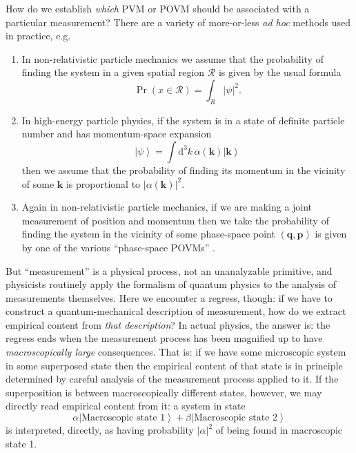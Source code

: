 \documentclass[12pt]{article}
\newcommand{\be}{\begin{equation}}
\newcommand{\ee}{\end{equation}}
\newcommand{\vctr}[1]{\ensuremath{\mathbf{ #1 }}}
\newcommand{\dr}[1]{\ensuremath{\mathrm{d} #1\,}}
\newcommand{\mc}[1]{\ensuremath{\mathcal{#1}}}
\newcommand{\ket}[1]{\ensuremath{\left|  #1 \right\rangle}}
\begin{document}
How do we establish \emph{which} PVM or POVM should be associated with a particular measurement? There are a variety of more-or-less \emph{ad hoc} methods used in practice, e.g.
\begin{enumerate}
\item In non-relativistic particle mechanics we assume that the probability of finding the system in a given spatial region \mc{R} is given by the usual formula 
\be
\Pr(x \in \mc{R})=\int_R |\psi|^2.
\ee
\item In high-energy particle physics,  if the system is in a state of definite particle number and has momentum-space expansion
\be
\ket{\psi}=\int \dr{^3 k} \alpha(\vctr{k}) \ket{\vctr{k}}
\ee
then we assume that the probability of finding its momentum in the vicinity of some $\vctr{k}$ is proportional to $|\alpha(\vctr{k})|^2$.
\item Again in non-relativistic particle mechanics, if we are making a joint measurement of position and momentum then we take the probability of finding the system in the vicinity of some phase-space point $(\vctr{q},\vctr{p})$ is given by one of the various ``phase-space POVMs'' \cite{buschmeasurement}.
\end{enumerate}

But ``measurement'' is a physical process, not an unanalyzable primitive, and  physicists routinely apply the formalism of quantum physics to the analysis of measurements themselves. Here we encounter a regress, though: if we have to construct a quantum-mechanical description of measurement, how do we extract empirical content from \emph{that description}? In actual physics, the answer is:  the regress ends when the measurement process has been magnified up to have \emph{macroscopically large} consequences. That is: if we have some microscopic system in some superposed state then the empirical content of that state is in principle determined by careful analysis of the measurement process applied to it. If the superposition is between macroscopically different states, however, we may directly read empirical content from it: a system in state
\be
\alpha \ket{\mathrm{\mbox{Macroscopic state 1}}}+ \beta\ket{\mathrm{\mbox{Macroscopic state 2}}}
\ee
 is interpreted, directly, as having probability $|\alpha|^2$ of being found in macroscopic state 1.
 
\end{document}
